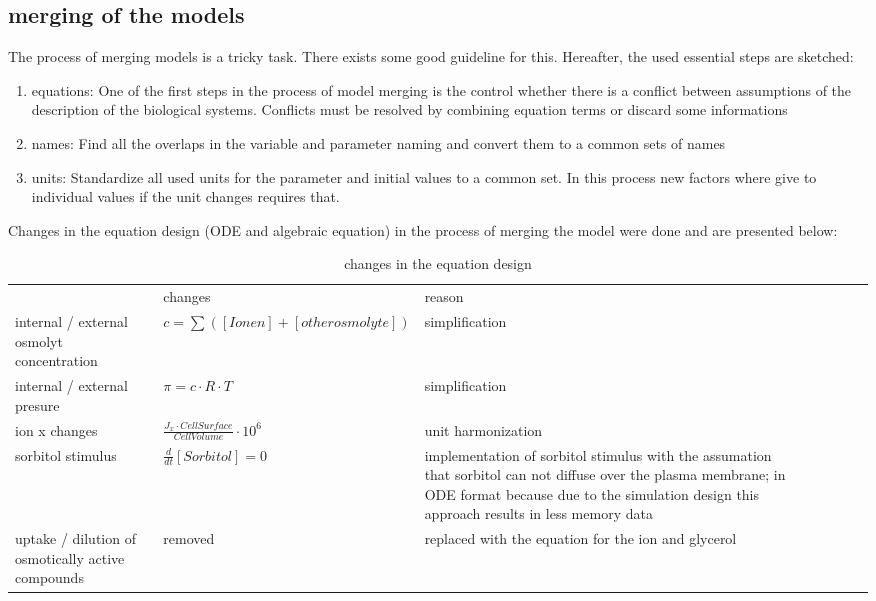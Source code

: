 \subsection{merging of the models}
The process of merging models is a tricky task. There exists some good guideline \cite{Liebermeister2008ValidityAC} for this.
Hereafter, the used essential steps are sketched:
\begin{enumerate}
	\item equations: One of the first steps in the process of model merging is the control whether there is a conflict between assumptions of the description of the biological systems. Conflicts must be resolved by combining equation terms or discard some informations
	\item names: Find all the overlaps in the variable and parameter naming and convert them to a common sets of names
	\item units: Standardize all used units for the parameter and initial values to a common set. In this process new factors where give to individual values if the unit changes requires that.
\end{enumerate}
Changes in the equation design (ODE and algebraic equation) in the process of merging the model were done and are presented below:
\begin{table} [h]
	\footnotesize
\begin{center} 
	\caption{changes in the equation design}
\begin{tabular} {l l l l l l l l}
& changes & reason\\
internal / external osmolyt concentration & $c = \sum ([Ionen]+[other osmolyte])$ & simplification\\ 
internal / external presure & $\pi = c \cdot R \cdot T	$ & simplification\\
ion x changes & $\frac{J_x \cdot CellSurface}{CellVolume} \cdot 10^{6}$ & unit harmonization\\
sorbitol stimulus & $\frac{d}{dt}[Sorbitol]=0$ & implementation of sorbitol stimulus with the assumation that sorbitol can not diffuse over the plasma membrane; in ODE format because due to the simulation design this approach results in less memory data\\
uptake / dilution of osmotically active compounds & removed & replaced with the equation for the ion and glycerol
\end{tabular}
\label{changesOnTheModels}
\end{center}
\end{table}

